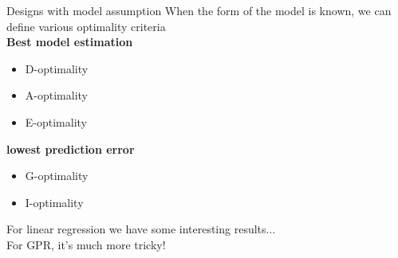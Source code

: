 \documentclass{beamer}
\begin{document}
\begin{frame}{Designs with model assumption}
When the form of the model is known, we can define various optimality criteria\\ \vspace{3mm}
\textbf{Best model estimation}
\begin{itemize}
	\item D-optimality
	\item A-optimality
	\item E-optimality
\end{itemize}
\vspace{3mm}
\textbf{lowest prediction error}
\begin{itemize}
	\item G-optimality
	\item I-optimality
\end{itemize}
\vspace{3mm}
For linear regression we have some interesting results... \\
For GPR, it's much more tricky!
\end{frame}



\end{document}
